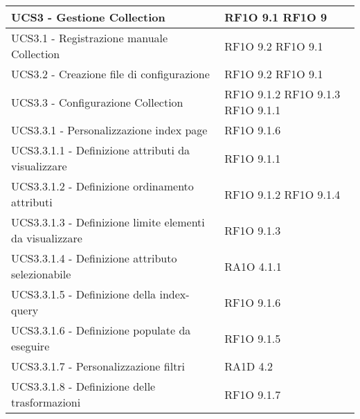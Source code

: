 \begin{center}
\begin{longtable}{ | p{5cm} | p{5cm} |}
            UCS3 - Gestione Collection &  RF1O 9.1  \newline  RF1O 9  \newline  \\ \hline      
            UCS3.1 - Registrazione manuale Collection &  RF1O 9.2 \newline  RF1O 9.1  \newline  \\ \hline      
            UCS3.2 - Creazione file di configurazione &  RF1O 9.2 \newline  RF1O 9.1  \newline  \\ \hline      
            UCS3.3 - Configurazione Collection &  RF1O 9.1.2  \newline  RF1O 9.1.3  \newline  RF1O 9.1.1  \newline  \\ \hline      
            UCS3.3.1 - Personalizzazione index page &  RF1O 9.1.6 \newline  \\ \hline      
            UCS3.3.1.1 - Definizione attributi da visualizzare &  RF1O 9.1.1  \newline  \\ \hline      
            UCS3.3.1.2 - Definizione ordinamento attributi &  RF1O 9.1.2  \newline  RF1O 9.1.4  \newline  \\ \hline      
            UCS3.3.1.3 - Definizione limite elementi da visualizzare &  RF1O 9.1.3  \newline  \\ \hline      
            UCS3.3.1.4 - Definizione attributo selezionabile &  RA1O 4.1.1  \newline  \\ \hline      
            UCS3.3.1.5 - Definizione della index-query &  RF1O 9.1.6 \newline  \\ \hline      
            UCS3.3.1.6 - Definizione populate da eseguire &  RF1O 9.1.5 \newline  \\ \hline      
            UCS3.3.1.7 - Personalizzazione filtri &  RA1D 4.2  \newline  \\ \hline      
            UCS3.3.1.8 - Definizione delle trasformazioni &  RF1O 9.1.7 \newline  \\ \hline      

\end{longtable}
\end{center}
